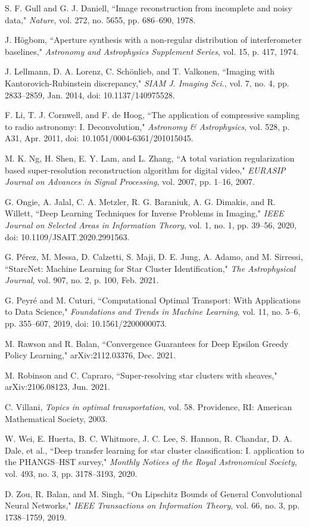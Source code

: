 \documentclass[conference]{IEEEtran}
\begin{document}
\begin{thebibliography}{00}
S. F. Gull and G. J. Daniell, ``Image reconstruction from incomplete and noisy data," \emph{Nature}, vol. 272, no. 5655, pp. 686–690, 1978.

J. Högbom, ``Aperture synthesis with a non-regular distribution of interferometer baselines," \emph{Astronomy and Astrophysics Supplement Series}, vol. 15, p. 417, 1974.

J. Lellmann, D. A. Lorenz, C. Schönlieb, and T. Valkonen, ``Imaging with Kantorovich-Rubinstein discrepancy," \emph{SIAM J. Imaging Sci.}, vol. 7, no. 4, pp. 2833–2859, Jan. 2014, doi: 10.1137/140975528.

F. Li, T. J. Cornwell, and F. de Hoog, ``The application of compressive sampling to radio astronomy: I. Deconvolution," \emph{Astronomy \& Astrophysics}, vol. 528, p. A31, Apr. 2011, doi: 10.1051/0004-6361/201015045.

M. K. Ng, H. Shen, E. Y. Lam, and L. Zhang, ``A total variation regularization based super-resolution reconstruction algorithm for digital video," \emph{EURASIP Journal on Advances in Signal Processing}, vol. 2007, pp. 1–16, 2007.

G. Ongie, A. Jalal, C. A. Metzler, R. G. Baraniuk, A. G. Dimakis, and R. Willett, ``Deep Learning Techniques for Inverse Problems in Imaging," \emph{IEEE Journal on Selected Areas in Information Theory}, vol. 1, no. 1, pp. 39–56, 2020, doi: 10.1109/JSAIT.2020.2991563.

G. Pérez, M. Messa, D. Calzetti, S. Maji, D. E. Jung, A. Adamo, and M. Sirressi, ``StarcNet: Machine Learning for Star Cluster Identification," \emph{The Astrophysical Journal}, vol. 907, no. 2, p. 100, Feb. 2021.

G. Peyré and M. Cuturi, ``Computational Optimal Transport: With Applications to Data Science," \emph{Foundations and Trends in Machine Learning}, vol. 11, no. 5–6, pp. 355–607, 2019, doi: 10.1561/2200000073.

M. Rawson and R. Balan, ``Convergence Guarantees for Deep Epsilon Greedy Policy Learning," arXiv:2112.03376, Dec. 2021.

M. Robinson and C. Capraro, ``Super-resolving star clusters with sheaves," arXiv:2106.08123, Jun. 2021.

C. Villani, \emph{Topics in optimal transportation}, vol. 58. Providence, RI: American Mathematical Society, 2003.

W. Wei, E. Huerta, B. C. Whitmore, J. C. Lee, S. Hannon, R. Chandar, D. A. Dale, et al., ``Deep transfer learning for star cluster classification: I. application to the PHANGS–HST survey," \emph{Monthly Notices of the Royal Astronomical Society}, vol. 493, no. 3, pp. 3178–3193, 2020.

D. Zou, R. Balan, and M. Singh, ``On Lipschitz Bounds of General Convolutional Neural Networks," \emph{IEEE Transactions on Information Theory}, vol. 66, no. 3, pp. 1738–1759, 2019.

\end{thebibliography}
\end{document}
